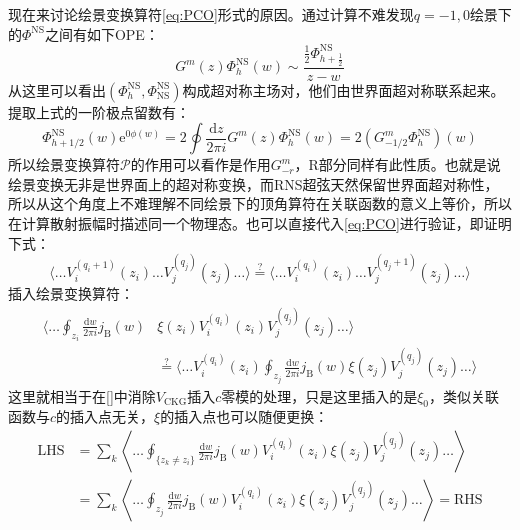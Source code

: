 现在来讨论绘景变换算符\ref{eq:PCO}形式的原因。通过计算不难发现$q=-1,0$绘景下的$\Phi^{\text{NS}}$之间有如下OPE：
\begin{equation}
	G^m(z)\Phi_h^{\text{NS}}(w)\sim\frac{\frac12\Phi_{h+\frac12}^{\text{NS}}}{z-w}
\end{equation}
从这里可以看出$(\Phi^{\text{NS}}_h,\Phi^{\text{NS}}_{\text{NS}})$构成超对称主场对，他们由世界面超对称联系起来。提取上式的一阶极点留数有：
\begin{equation}
	\Phi_{h+1/2}^{\mathrm{NS}}(w)\mathrm{e}^{0\phi(w)}=2\oint\frac{\mathrm{d}z}{2\pi i}G^m(z)\Phi_h^{\mathrm{NS}}(w)=2(G^m_{-1/2}\Phi_h^{\mathrm{NS}})(w)
\end{equation}
所以绘景变换算符$\mathcal{P}$的作用可以看作是作用$G^m_{-r}$，R部分同样有此性质。也就是说绘景变换无非是世界面上的超对称变换，而RNS超弦天然保留世界面超对称性，所以从这个角度上不难理解不同绘景下的顶角算符在关联函数的意义上等价，所以在计算散射振幅时描述同一个物理态。也可以直接代入\ref{eq:PCO}进行验证，即证明下式：
\begin{equation}
		\langle\ldots V_i^{(q_i+1)}(z_i)\ldots V_j^{(q_j)}(z_j)\ldots\rangle\overset{?}{\operatorname*{\operatorname*{=}}}\langle\ldots V_i^{(q_i)}(z_i)\ldots V_j^{(q_j+1)}(z_j)\ldots\rangle
\end{equation}
插入绘景变换算符：
\begin{equation}
\begin{aligned}
		\bigg\langle\ldots\oint_{z_i}\frac{\mathrm{d}w}{2\pi i}j_{\mathrm{B}}(w)&\xi(z_i)V_i^{(q_i)}(z_i)V_j^{(q_j)}(z_j)\ldots\bigg\rangle\\&\overset{?}{\operatorname*{=}}
		\bigg\langle\ldots V_i^{(q_i)}(z_i)\oint_{z_j}\frac{\mathrm{d}w}{2\pi i}j_{\mathrm{B}}(w)\xi(z_j)V_j^{(q_j)}(z_j)\ldots\bigg\rangle
\end{aligned}
\end{equation}
这里就相当于在\ref{}中消除$V_{\text{CKG}}$插入$c$零模的处理，只是这里插入的是$\xi_0$，类似关联函数与$c$的插入点无关，$\xi$的插入点也可以随便更换：
\begin{equation}
\begin{aligned}
		\text{LHS} &= \sum_{k}\left\langle\ldots\oint_{\{z_k\neq z_i\}}\frac{\mathrm{d}w}{2\pi i}j_{\mathrm{B}}(w)V_i^{(q_i)}(z_i)\xi(z_j)V_j^{(q_j)}(z_j)\ldots\right\rangle\\
		&=\sum_{k}\left\langle\ldots\oint_{z_j}\frac{\mathrm{d}w}{2\pi i}j_{\mathrm{B}}(w)V_i^{(q_i)}(z_i)\xi(z_j)V_j^{(q_j)}(z_j)\ldots\right\rangle=\text{RHS}\\
\end{aligned}
\end{equation}
